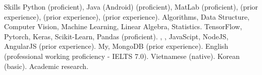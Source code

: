 
\begin{rubric}{Skills}
%
	Python (proficient), Java (Android) (proficient), MatLab (proficient),  (prior experience),  (prior experience),  (prior experience).
%
	Algorithms, Data Structure, Computer Vision, Machine Learning, Linear Algebra, Statistics.
%
	TensorFlow, Pytorch, Keras, Scikit-Learn, Pandas (proficient).
%
	, , JavaScipt, NodeJS, AngularJS (prior experience).
\entry*[Databases]%
	My, MongoDB (prior experience).
\entry*[Languages]%
	English (professional working proficiency - IELTS 7.0). Vietnamese (native).
	Korean (basic).
\entry*[Misc.]%
	Academic research.
\end{rubric}
